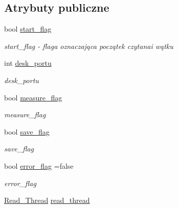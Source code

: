 \subsection*{Atrybuty publiczne}
\begin{DoxyCompactItemize}
\item 
\hypertarget{class_okno_a0cd2b4f8ec74806cc7d3256eff69385a}{bool \hyperlink{class_okno_a0cd2b4f8ec74806cc7d3256eff69385a}{start\-\_\-flag}}\label{class_okno_a0cd2b4f8ec74806cc7d3256eff69385a}

\begin{DoxyCompactList}\small\item\em start\-\_\-flag -\/ flaga oznaczająca początek czytanai wątku \end{DoxyCompactList}\item 
\hypertarget{class_okno_ac9c31fbce4cb68413088827860277510}{int \hyperlink{class_okno_ac9c31fbce4cb68413088827860277510}{desk\-\_\-portu}}\label{class_okno_ac9c31fbce4cb68413088827860277510}

\begin{DoxyCompactList}\small\item\em desk\-\_\-portu \end{DoxyCompactList}\item 
\hypertarget{class_okno_a5a94843afcfc67735c25e5a29f9cdc3c}{bool \hyperlink{class_okno_a5a94843afcfc67735c25e5a29f9cdc3c}{measure\-\_\-flag}}\label{class_okno_a5a94843afcfc67735c25e5a29f9cdc3c}

\begin{DoxyCompactList}\small\item\em measure\-\_\-flag \end{DoxyCompactList}\item 
\hypertarget{class_okno_afddfe7d21fc34910d75f92d8904acb23}{bool \hyperlink{class_okno_afddfe7d21fc34910d75f92d8904acb23}{save\-\_\-flag}}\label{class_okno_afddfe7d21fc34910d75f92d8904acb23}

\begin{DoxyCompactList}\small\item\em save\-\_\-flag \end{DoxyCompactList}\item 
\hypertarget{class_okno_a3cfa8a75106400dd97108bdca0e69cd5}{bool \hyperlink{class_okno_a3cfa8a75106400dd97108bdca0e69cd5}{error\-\_\-flag} =false}\label{class_okno_a3cfa8a75106400dd97108bdca0e69cd5}

\begin{DoxyCompactList}\small\item\em error\-\_\-flag \end{DoxyCompactList}\item 
\hypertarget{class_okno_a6f836849c2547fcb51936a9c88c8e75a}{\hyperlink{class_read___thread}{Read\-\_\-\-Thread} \hyperlink{class_okno_a6f836849c2547fcb51936a9c88c8e75a}{read\-\_\-thread}}\label{class_okno_a6f836849c2547fcb51936a9c88c8e75a}


\end{DoxyCompactItemize}
